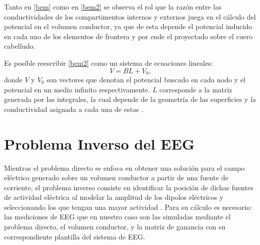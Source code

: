 Tanto en \cref{bem} como en \cref{bem2} se observa el rol que la razón entre las conductividades de los compartimentos internos y externos juega en el cálculo del potencial en el volumen conductor, ya que de esta depende el potencial inducido en cada uno de los elementos de frontera y por ende el proyectado sobre el cuero cabelludo.

Es posible reescribir \cref{bem2} como un sistema de ecuaciones lineales:
\begin{equation}
	\label{lineal}
	V = BL + V_{0},
\end{equation}
donde $V$ y $V_{0}$ son vectores que denotan el potencial buscado en cada nodo y el potencial en un medio infinito respectivamente.
$L$ corresponde a la matriz generada por las integrales, la cual depende de la geometría de las superficies y la conductividad asignada a cada una de estas \cite{Hallez2007}.

\section{Problema Inverso del EEG}
\label{sec:intro:inverse}

Mientras el problema directo se enfoca en obtener una solución para el campo eléctrico generado sobre un volumen conductor a partir de una fuente de corriente, el problema inverso consiste en identificar la posición de dichas fuentes de actividad eléctrica al modelar la amplitud de los dipolos eléctricos y seleccionando los que tengan una mayor actividad \cite{Baillet2001}.
Para su cálculo es necesario: las mediciones de EEG que en nuestro caso son las simuladas mediante el problema directo, el volumen conductor, y la matriz de ganancia con su correspondiente plantilla del sistema de EEG.

